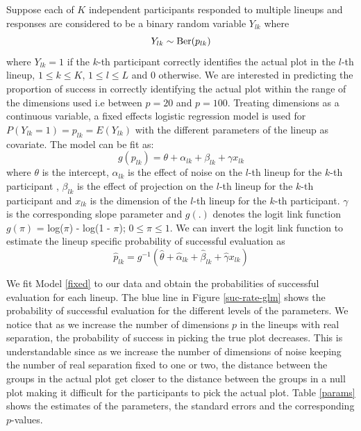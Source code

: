 \documentclass[12]{article}
\begin{document}
Suppose each of $K$ independent participants responded to multiple lineups and responses are considered to be a binary random variable $Y_{lk}$ where $$Y_{lk} \sim \hbox{Ber}(p_{lk})$$ where $Y_{lk} = 1$ if the $k$-th participant correctly identifies the actual plot in the $l$-th lineup, $1 \leq k \leq K$, $1 \leq l \leq L$ and 0 otherwise. We are interested in predicting the proportion of success in correctly identifying the actual plot within the range of the dimensions used i.e between $p = 20$ and $p = 100$. Treating dimensions as a continuous variable, a fixed effects logistic regression model is used for $P(Y_{lk} = 1) = p_{lk} = E(Y_{lk})$ with the different parameters of the lineup as covariate.
The model can be fit as:
\begin{equation}
g(p_{lk}) = \theta + \alpha_{lk} + \beta_{lk} + \gamma x_{lk} \label{fixed}
\end{equation}
where $\theta$ is the intercept, $\alpha_{lk}$ is the effect of noise on the $l$-th lineup for the $k$-th participant ,
$\beta_{lk}$ is the effect of projection on the $l$-th lineup for the $k$-th participant 
and $x_{lk}$ is the dimension of the $l$-th lineup for the $k$-th participant. $\gamma$ is the corresponding slope parameter and $g(.)$ denotes the logit link function $g(\pi)$ = log($\pi$) - log(1 - $\pi$); $0 \leq \pi \leq 1$.  We can invert the logit link function to estimate the lineup specific probability of successful evaluation as 
\begin{equation}
\hat{p}_{lk} = g^{-1}(\hat{\theta} + \hat{\alpha}_{lk} + \hat{\beta}_{lk} + \hat{\gamma} x_{lk}) \label{invert}
\end{equation}

We fit Model \ref{fixed} to our data and obtain the probabilities of successful evaluation for each lineup.  The blue line in Figure \ref{suc-rate-glm} shows the probability of successful evaluation for the different levels of the parameters. We notice that as we increase the number of dimensions $p$ in the lineups with real separation, the probability of success in picking the true plot decreases. This is understandable since as we increase the number of dimensions of noise keeping the number of real separation fixed to one or two, the distance between the groups in the actual plot get closer to the distance between the groups in a null plot making it difficult for the participants to pick the actual plot. Table \ref{params} shows the estimates of the parameters, the standard errors and the corresponding $p$-values.
\end{document}
